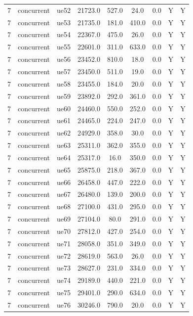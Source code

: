 \begin{table}[ht]
\begin{tabular}{|c|c|c|c|c|c|c|c|c|}
7 & concurrent & ue52 & 21723.0 & 527.0 & 24.0 & 0.0 & Y & Y \\
7 & concurrent & ue53 & 21735.0 & 181.0 & 410.0 & 0.0 & Y & Y \\
7 & concurrent & ue54 & 22367.0 & 475.0 & 26.0 & 0.0 & Y & Y \\
7 & concurrent & ue55 & 22601.0 & 311.0 & 633.0 & 0.0 & Y & Y \\
7 & concurrent & ue56 & 23452.0 & 810.0 & 18.0 & 0.0 & Y & Y \\
7 & concurrent & ue57 & 23450.0 & 511.0 & 19.0 & 0.0 & Y & Y \\
7 & concurrent & ue58 & 23455.0 & 184.0 & 20.0 & 0.0 & Y & Y \\
7 & concurrent & ue59 & 23892.0 & 292.0 & 361.0 & 0.0 & Y & Y \\
7 & concurrent & ue60 & 24460.0 & 550.0 & 252.0 & 0.0 & Y & Y \\
7 & concurrent & ue61 & 24465.0 & 224.0 & 247.0 & 0.0 & Y & Y \\
7 & concurrent & ue62 & 24929.0 & 358.0 & 30.0 & 0.0 & Y & Y \\
7 & concurrent & ue63 & 25311.0 & 362.0 & 355.0 & 0.0 & Y & Y \\
7 & concurrent & ue64 & 25317.0 & 16.0 & 350.0 & 0.0 & Y & Y \\
7 & concurrent & ue65 & 25875.0 & 218.0 & 367.0 & 0.0 & Y & Y \\
7 & concurrent & ue66 & 26458.0 & 447.0 & 222.0 & 0.0 & Y & Y \\
7 & concurrent & ue67 & 26480.0 & 139.0 & 200.0 & 0.0 & Y & Y \\
7 & concurrent & ue68 & 27100.0 & 431.0 & 295.0 & 0.0 & Y & Y \\
7 & concurrent & ue69 & 27104.0 & 80.0 & 291.0 & 0.0 & Y & Y \\
7 & concurrent & ue70 & 27812.0 & 427.0 & 254.0 & 0.0 & Y & Y \\
7 & concurrent & ue71 & 28058.0 & 351.0 & 349.0 & 0.0 & Y & Y \\
7 & concurrent & ue72 & 28619.0 & 563.0 & 26.0 & 0.0 & Y & Y \\
7 & concurrent & ue73 & 28627.0 & 231.0 & 334.0 & 0.0 & Y & Y \\
7 & concurrent & ue74 & 29189.0 & 440.0 & 221.0 & 0.0 & Y & Y \\
7 & concurrent & ue75 & 29401.0 & 290.0 & 634.0 & 0.0 & Y & Y \\
7 & concurrent & ue76 & 30246.0 & 790.0 & 20.0 & 0.0 & Y & Y \\

\end{tabular}
\end{table}
